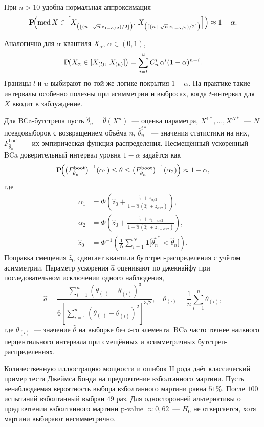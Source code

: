 При $n>10$ удобна нормальная аппроксимация \[ \operatorname{\mathbf{P}\!}\Bigl(\operatorname{med} X \in \Bigl[ X_{\bigl(\lfloor (n-\sqrt{n}\,z_{1-\alpha/2})/2\rfloor\bigr)},\, X_{\bigl(\lceil (n+\sqrt{n}\,z_{1-\alpha/2})/2\rceil\bigr)} \Bigr]\Bigr) \approx 1-\alpha.
\]

Аналогично для $\alpha$-квантиля $X_\alpha$, $\alpha\in(0,1)$, \[ \operatorname{\mathbf{P}\!}\bigl(X_\alpha \in [X_{(l)},\, X_{(u)}]\bigr) =\sum_{i=l}^{u} C_n^i\,\alpha^i(1-\alpha)^{n-i}.
\] Границы $l$ и $u$ выбирают по той же логике покрытия $1-\alpha$.
На практике такие интервалы особенно полезны при асимметрии и выбросах, когда $t$-интервал для $\bar X$ вводит в заблуждение.

Для BCa-бутстрепа \citep{efron1993} пусть $\hat\theta_n=\hat\theta(X^n)$~--- оценка параметра, $X^{1*},\ldots,X^{N*}$~--- $N$ псевдовыборок с возвращением объёма $n$, $\hat\theta_n^{i*}$~--- значения статистики на них, $F_{\hat\theta_n}^{\mathrm{boot}}$~--- их эмпирическая функция распределения.
 Несмещённый ускоренный BCa доверительный интервал уровня $1-\alpha$ задаётся как \[ \operatorname{\mathbf{P}\!}\Bigl( \bigl(F_{\hat\theta_n}^{\mathrm{boot}}\bigr)^{-1}(\alpha_1) \le \theta \le \bigl(F_{\hat\theta_n}^{\mathrm{boot}}\bigr)^{-1}(\alpha_2) \Bigr)\approx 1-\alpha, \] где
\begin{align*}
\alpha_1 &= \Phi\!\left(
\hat{z}_0 + \frac{\hat{z}_0 + z_{\alpha/2}}{1 - \hat{a}\,(\hat{z}_0 + z_{\alpha/2})}
\right), \\
\alpha_2 &= \Phi\!\left(
\hat{z}_0 + \frac{\hat{z}_0 + z_{1-\alpha/2}}{1 - \hat{a}\,(\hat{z}_0 + z_{1-\alpha/2})}
\right), \\
\hat{z}_0 &= \Phi^{-1}\!\left(
\frac1N\sum_{i=1}^N \mathbf{1}\bigl[\hat\theta_n^{i*} < \hat\theta_n\bigr]
\right).
\end{align*}
Поправка смещения $\hat{z}_0$ сдвигает квантили бутстреп-распределения с учётом асимметрии. Параметр ускорения $\hat{a}$ оценивают по джекнайфу при последовательном исключении одного наблюдения, \[ \hat{a} =\frac{\sum_{i=1}^n (\bar{\theta}_{(\cdot)}-\theta_{(i)})^3} {6\left[\sum_{i=1}^n (\bar{\theta}_{(\cdot)}-\theta_{(i)})^2\right]^{3/2}}, \quad \bar{\theta}_{(\cdot)}=\frac1n\sum_{i=1}^n\theta_{(i)}, \] где $\theta_{(i)}$~--- значение $\hat\theta$ на выборке без $i$-го элемента.
BCa часто точнее наивного перцентильного интервала при смещённых и асимметричных бутстреп-распределениях.

Количественную иллюстрацию мощности и ошибок II рода даёт классический пример теста Джеймса Бонда на предпочтение взболтанного мартини.
Пусть ненаблюдаемая вероятность выбора взболтанного мартини равна $51\%$. После $100$ испытаний взболтанный выбран $49$ раз. Для односторонней альтернативы о предпочтении взболтанного мартини p-value $\approx 0{,}62$~--- $H_0$ не отвергается, хотя мартини выбирают несимметрично.

